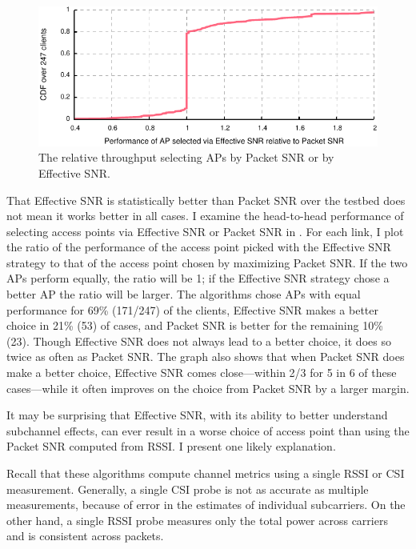 \begin{figure}[t]
	\centering
	\includegraphics[width=\textwidth]{figures/applications/ap_sel_ratio.pdf}
	\caption[The relative throughput selecting APs by Packet SNR or by Effective SNR]{\label{fig:ap_sel_ratio}The relative throughput selecting APs by Packet SNR or by Effective SNR.}
\end{figure}

That Effective SNR is statistically better than Packet SNR over the testbed does not mean it works better in all cases. I examine the head-to-head performance of selecting access points via Effective SNR or Packet SNR in . For each link, I plot the ratio of the performance of the access point picked with the Effective SNR strategy to that of the access point chosen by maximizing Packet SNR. If the two APs perform equally, the ratio will be 1; if the Effective SNR strategy chose a better AP the ratio will be larger. The algorithms chose APs with equal performance for 69\% (171/247) of the clients, Effective SNR makes a better choice in 21\% (53) of cases, and Packet SNR is better for the remaining 10\% (23). Though Effective SNR does not always lead to a better choice, it does so twice as often as Packet SNR. The graph also shows that when Packet SNR does make a better choice, Effective SNR comes close---within 2/3 for 5 in 6 of these cases---while it often improves on the choice from Packet SNR by a larger margin.

 It may be surprising that Effective SNR, with its ability to better understand subchannel effects, can ever result in a worse choice of access point than using the Packet SNR computed from RSSI. I present one likely explanation.

Recall that these algorithms compute channel metrics using a single RSSI or CSI measurement. Generally, a single CSI probe is not as accurate as multiple measurements, because of error in the estimates of individual subcarriers. On the other hand, a single RSSI probe measures only the total power across carriers and is consistent across packets.


